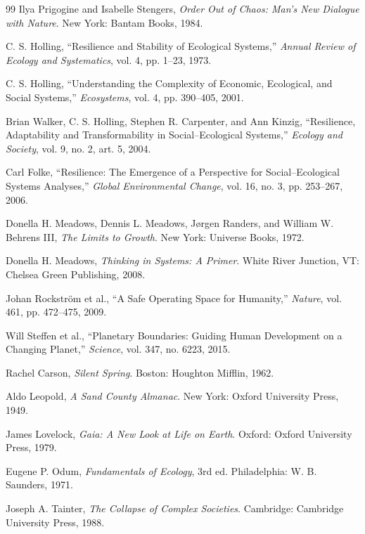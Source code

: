 \documentclass[11pt,oneside]{book}
\theoremstyle{definition}
\theoremstyle{remark}
\begin{document}
\begin{thebibliography}{99}
 Ilya Prigogine and Isabelle Stengers, \emph{Order Out of Chaos: Man's New Dialogue with Nature}.
  New York: Bantam Books, 1984.

 C. S. Holling, ``Resilience and Stability of Ecological Systems,'' \emph{Annual Review of
  Ecology and Systematics}, vol. 4, pp. 1--23, 1973.

 C. S. Holling, ``Understanding the Complexity of Economic, Ecological, and Social Systems,''
  \emph{Ecosystems}, vol. 4, pp. 390--405, 2001.

 Brian Walker, C. S. Holling, Stephen R. Carpenter, and Ann Kinzig, ``Resilience, Adaptability
  and Transformability in Social--Ecological Systems,'' \emph{Ecology and Society}, vol. 9, no.
  2, art. 5, 2004.

 Carl Folke, ``Resilience: The Emergence of a Perspective for Social--Ecological Systems
  Analyses,'' \emph{Global Environmental Change}, vol. 16, no. 3, pp. 253--267, 2006.

 Donella H. Meadows, Dennis L. Meadows, J{\o}rgen Randers, and William W. Behrens III, \emph{The
  Limits to Growth}. New York: Universe Books, 1972.

 Donella H. Meadows, \emph{Thinking in Systems: A Primer}. White River Junction, VT: Chelsea
  Green Publishing, 2008.

 Johan Rockstr\"om et al., ``A Safe Operating Space for Humanity,'' \emph{Nature}, vol. 461, pp.
  472--475, 2009.

 Will Steffen et al., ``Planetary Boundaries: Guiding Human Development on a Changing Planet,''
  \emph{Science}, vol. 347, no. 6223, 2015.

 Rachel Carson, \emph{Silent Spring}. Boston: Houghton Mifflin, 1962.

 Aldo Leopold, \emph{A Sand County Almanac}. New York: Oxford University Press, 1949.

 James Lovelock, \emph{Gaia: A New Look at Life on Earth}. Oxford: Oxford University Press, 1979.

 Eugene P. Odum, \emph{Fundamentals of Ecology}, 3rd ed. Philadelphia: W. B. Saunders, 1971.

 Joseph A. Tainter, \emph{The Collapse of Complex Societies}. Cambridge: Cambridge University
  Press, 1988.


\end{thebibliography}
\end{document}
